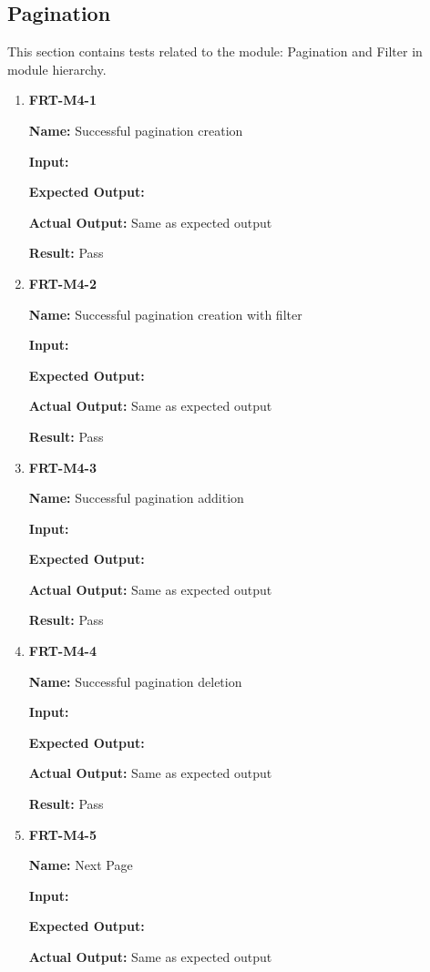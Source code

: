\documentclass[12pt, titlepage]{article}
\begin{document}
\subsection{Pagination}
This section contains tests related to the module: Pagination and Filter in module hierarchy.
\begin{enumerate}
\item \textbf{FRT-M4-1}

\textbf{Name:} Successful pagination creation

\textbf{Input:} 

\textbf{Expected Output:} 

\textbf{Actual Output:} Same as expected output

\textbf{Result:} Pass

\item \textbf{FRT-M4-2}

\textbf{Name:} Successful pagination creation with filter

\textbf{Input:} 

\textbf{Expected Output:} 

\textbf{Actual Output:} Same as expected output

\textbf{Result:} Pass

\item \textbf{FRT-M4-3}

\textbf{Name:} Successful pagination addition

\textbf{Input:} 

\textbf{Expected Output:} 

\textbf{Actual Output:} Same as expected output

\textbf{Result:} Pass

\item \textbf{FRT-M4-4}

\textbf{Name:} Successful pagination deletion

\textbf{Input:} 

\textbf{Expected Output:} 

\textbf{Actual Output:} Same as expected output

\textbf{Result:} Pass

\item \textbf{FRT-M4-5}

\textbf{Name:} Next Page

\textbf{Input:} 

\textbf{Expected Output:} 

\textbf{Actual Output:} Same as expected output


\end{enumerate}
\end{document}
